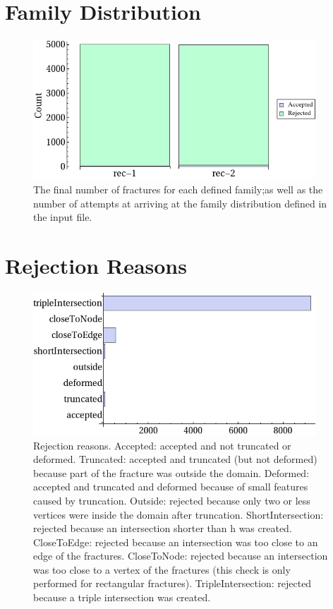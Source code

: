 \documentclass[a4paper,11pt]{article}
\begin{document}
\section{Family Distribution}
\begin{figure}[H]
  \centering
  \includegraphics[width=300pt]{graphFamilyDist.png}
  \caption[Family distribution]{The final number of fractures for each defined family;as well as the number of attempts at arriving at the family distribution defined in the input file.}
\end{figure}

\section{Rejection Reasons}
\begin{figure}[H]
   \centering
    \includegraphics[width=300pt]{graphRejReasons.png} \caption[Rejection reasons]{Rejection reasons. Accepted: accepted and not truncated or deformed. Truncated: accepted and truncated (but not deformed) because part of the fracture was outside the domain. Deformed: accepted and truncated and deformed because of small features caused by truncation. Outside: rejected because only two or less vertices were inside the domain after truncation. ShortIntersection: rejected because an intersection shorter than h was created. CloseToEdge: rejected because an intersection was too close to an edge of the fractures. CloseToNode: rejected because an intersection was too close to a vertex of the fractures (this check is only performed for rectangular fractures). TripleIntersection: rejected because a triple intersection was created. }
\end{figure}
\end{document}
